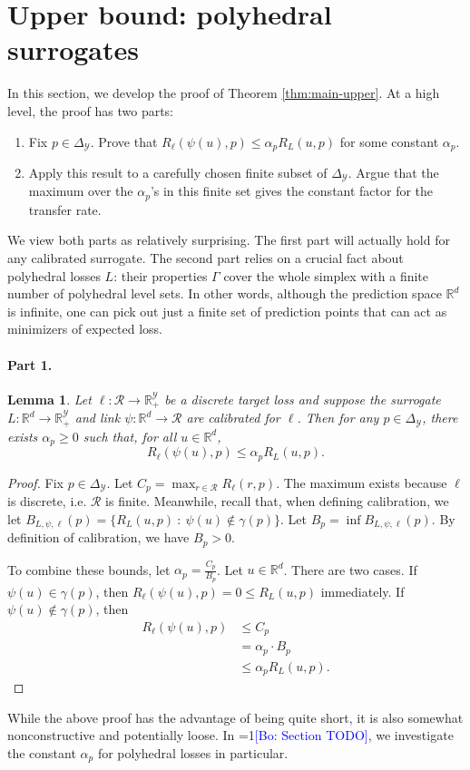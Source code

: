 \documentclass{article}
\newtheorem{lemma}{Lemma}
\newcommand{\Comments}{1}
\newcommand{\mynote}[2]{\ifnum\Comments=1\textcolor{#1}{#2}\fi}
\newcommand{\bo}[1]{\mynote{blue}{[Bo: #1]}}
\newcommand{\reals}{\mathbb{R}}
\newcommand{\simplex}{\Delta_\Y}
\newcommand{\R}{\mathcal{R}}
\newcommand{\Y}{\mathcal{Y}}
\begin{document}
\section{Upper bound: polyhedral surrogates}
In this section, we develop the proof of Theorem \ref{thm:main-upper}.
At a high level, the proof has two parts:
\begin{enumerate}
  \item Fix $p \in \simplex$.
        Prove that $R_{\ell}(\psi(u),p) \leq \alpha_p R_L(u,p)$ for some constant $\alpha_p$.
  \item Apply this result to a carefully chosen finite subset of $\simplex$. Argue that the maximum over the $\alpha_p$'s in this finite set gives the constant factor for the transfer rate.
\end{enumerate}
We view both parts as relatively surprising.
The first part will actually hold for any calibrated surrogate.
The second part relies on a crucial fact about polyhedral losses $L$: their properties $\Gamma$ cover the whole simplex with a finite number of polyhedral level sets.
In other words, although the prediction space $\reals^d$ is infinite, one can pick out just a finite set of prediction points that can act as minimizers of expected loss.

\paragraph{Part 1.}
\begin{lemma} \label{lemma:fixed-p}
  Let $\ell: \R \to \reals_+^{\Y}$ be a discrete target loss and suppose the surrogate $L: \reals^d \to \reals_+^{\Y}$ and link $\psi: \reals^d \to \R$ are calibrated for $\ell$.
  Then for any $p \in \simplex$, there exists $\alpha_p \geq 0$ such that, for all $u \in \reals^d$,
    \[ R_{\ell}(\psi(u),p) \leq \alpha_p R_L(u,p) . \]
\end{lemma}
\begin{proof}
  Fix $p \in \simplex$.
  Let $C_p = \max_{r \in \R} R_{\ell}(r,p)$.
  The maximum exists because $\ell$ is discrete, i.e. $\R$ is finite.
  Meanwhile, recall that, when defining calibration, we let $B_{L,\psi,\ell}(p) = \{R_L(u,p) ~:~ \psi(u) \not\in \gamma(p)\}$.
  Let $B_p = \inf B_{L,\psi,\ell}(p)$.
  By definition of calibration, we have $B_p > 0$.

  To combine these bounds, let $\alpha_p = \frac{C_p}{B_p}$.
  Let $u \in \reals^d$.
  There are two cases.
  If $\psi(u) \in \gamma(p)$, then $R_{\ell}(\psi(u),p) = 0 \leq R_L(u,p)$ immediately.
  If $\psi(u) \not\in \gamma(p)$, then
  \begin{align*}
    R_{\ell}(\psi(u),p)
    &\leq C_p \\
    &=    \alpha_p \cdot B_p  \\
    &\leq \alpha_p R_L(u,p) .
  \end{align*}
\end{proof}
While the above proof has the advantage of being quite short, it is also somewhat nonconstructive and potentially loose.
In \bo{Section TODO}, we investigate the constant $\alpha_p$ for polyhedral losses in particular.
\end{document}
